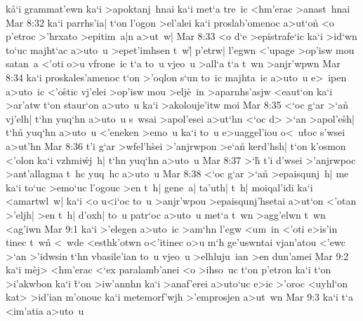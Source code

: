 k\r{a}`i
grammat'ewn
ka`i
>apoktanj~hnai
ka`i
met`a
tre~ic
<hm'erac
>anast~hnai\bibvsend
\vs Mar 8:32
ka`i
parrhs'ia|
t`on
l'ogon
>el'alei
ka`i
proslab'omenoc
a>ut`on\r{}
<o
p'etroc
>'hrxato
>epitim~a|n
a>ut~w|\bibvsend
\vs Mar 8:33
<o
d`e
>epistrafe`ic
ka`i
>id`wn
to`uc
majht`ac
a>uto~u
>epet'imhsen
t~w|\r{}
p'etrw|
l'egwn
<'upage
>op'isw
mou
satan~a
<'oti
o>u
vfrone~ic
t`a
to~u
vjeo~u
>all`a
t`a
t~wn
>anjr'wpwn\bibvsend
\vs Mar 8:34
ka`i
proskales'amenoc
t`on
>'oqlon
s`un
to~ic
majhta~ic
a>uto~u
e>~ipen
a>uto~ic
<'o\r{s}tic
vj'elei
>op'isw
mou
>elj\r{e}~in
>aparnhs'asjw
<eaut`on
ka`i
>ar'atw
t`on
staur`on
a>uto~u
ka`i
>akolouje'itw
moi\bibvsend
\vs Mar 8:35
<`oc
g`ar
>`a\r{n}
vj'elh|
t`hn
yuq`hn
a>uto~u
s~wsai
>apol'esei
a>ut`hn
<`oc
d>
>`an
>apol'e\r{s}h|
t`hn\r{}
yuq`hn
a>uto~u
<'eneken
>emo~u
ka`i
to~u
e>uaggel'iou
o<~u\r{t}oc
s'wsei
a>ut'hn\bibvsend
\vs Mar 8:36
t'i
g`ar
>wfel'h\r{s}ei
>'anjrwpon
>e`an\r{}
kerd'hsh|
t`on
k'osmon
<'olon
ka`i
vzhmi\r{w}j~h|
t`hn
yuq`hn
a>uto~u\bibvsend
\vs Mar 8:37
>`h\r{}
t'i
d'wsei
>'anjrwpoc
>ant'allagma
t~hc
yuq~hc
a>uto~u\bibvsend
\vs Mar 8:38
<`oc
g`ar
>`a\r{n}
>epaisqunj~h|
me
ka`i
to`uc
>emo`uc
l'ogouc
>en
t~h|
gene~a|
ta'uth|
t~h|
moiqal'idi
ka`i
<amartwl~w|
ka`i
<o
u<i`oc
to~u
>anjr'wpou
>epaisqunj'hsetai
a>ut`on
<'otan
>'eljh|
>en
t~h|
d'oxh|
to~u
patr`oc
a>uto~u
met`a
t~wn
>agg'elwn
t~wn
<ag'iwn\bibvsend
\vs Mar 9:1
ka`i
>'elegen
a>uto~ic
>am`hn
l'egw
<um~in
<'oti
e>is'in
tinec
t~wn\r{}
<~wde
<esthk'otwn
o<'itinec
o>u
m`h
ge'uswntai
vjan'atou
<'ewc
>`an
>'idwsin
t`hn
vbasile'ian
to~u
vjeo~u
>elhluju~ian
>en
dun'amei\bibvsend
\vs Mar 9:2
ka`i
m\r{e}j>
<hm'erac
<`ex
paralamb'anei
<o
>ihso~uc
t`on
p'etron
ka`i
t`on
>i'akwbon
ka`i
\r{t}`on
>iw'annhn
ka`i
>anaf'erei
a>uto`uc
e>ic
>'oroc
<uyhl`on
kat>
>id'ian
m'onouc
ka`i
metemorf'wjh
>'emprosjen
a>ut~wn\bibvsend
\vs Mar 9:3
ka`i
t`a
<im'atia
a>uto~u
